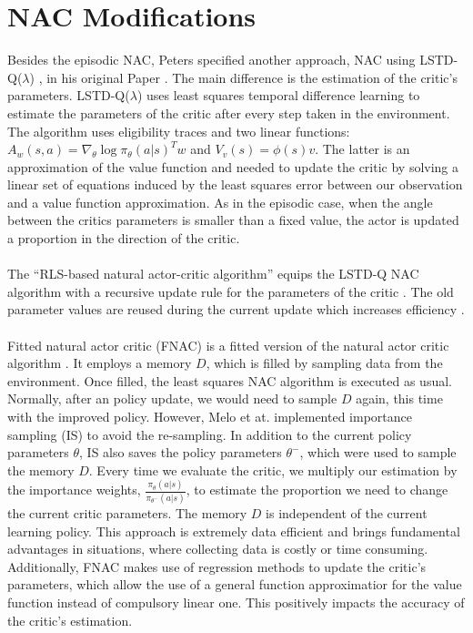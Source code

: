 \section{NAC Modifications}
\label{sec:modifications}
 Besides the episodic NAC, Peters specified another approach, NAC using LSTD-Q($\lambda$) \citep{lagoudakis2003least, boyan2002technical}, in his original Paper \citep{peters2005natural}. The main difference is the estimation of the critic's parameters. LSTD-Q($\lambda$) uses least squares temporal difference learning \citep{boyan1999least} to estimate the parameters of the critic after every step taken in the environment. The algorithm uses eligibility traces \cite{sutton2018reinforcement} and two linear functions: $A_w(s,a) = \nabla_{\theta} \log \pi_{\theta}(a|s)^Tw$ and $V_v(s) = \phi(s)v$.  The latter is an approximation of the value function and needed to update the critic by solving a linear set of equations induced by the least squares error between our observation and a value function approximation. As in the episodic case, when the angle between the critics parameters is smaller than a fixed value, the actor is updated a proportion in the direction of the critic.
\\\\
 The ``RLS-based natural actor-critic algorithm'' equips the LSTD-Q NAC algorithm with a recursive update rule for the parameters of the critic \cite{park2005rls}. The old parameter values are reused during the current update which increases efficiency \citep{xu2002efficient}.
\\\\
 Fitted natural actor critic (FNAC) is a fitted version of the natural actor critic algorithm \cite{melo2008fitted}.  It employs a memory $D$, which is filled by sampling data from the environment. Once filled, the least squares NAC algorithm is executed as usual. Normally, after an policy update, we would need to sample $D$ again, this time with the improved policy. However, Melo et at. implemented importance sampling (IS) \cite{sutton2018reinforcement} to avoid the re-sampling. In addition to the current policy parameters $\theta$, IS also saves the policy parameters $\theta^{-}$, which were used to sample the memory $D$. Every time we evaluate the critic, we multiply our estimation by the importance weights, \(\tfrac{\pi_{\theta}(a|s)}{\pi_{\theta^{-}}(a|s)}\), to estimate the proportion we need to change the current critic parameters. The memory $D$ is independent of the current learning policy. This approach is extremely data efficient and brings fundamental advantages in situations, where collecting data is costly or time consuming. Additionally, FNAC makes use of regression methods to update the critic's parameters, which allow the use of a general function approximatior for the value function instead of compulsory linear one. This positively impacts the accuracy of the critic's estimation. 
